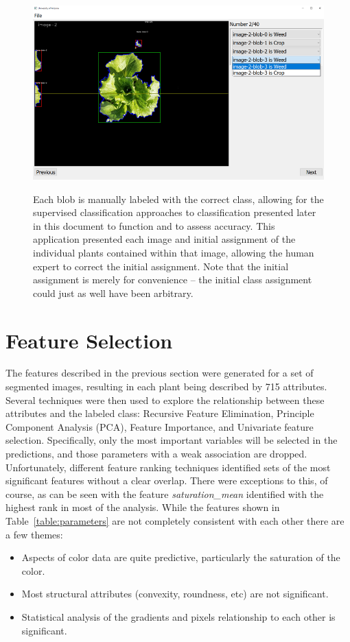 \documentclass[letterpaper]{article}
\begin{document}
{\begin{figure}[h!]
	\centering
	\includegraphics[width=12cm]{./figures/label-screenshot.png}
	\label{fig:label-screenshot}
	\caption[Screenshot of application for manually labeling blobs]{Each blob is manually labeled with the correct class, allowing for the supervised classification approaches to classification presented later in this document to function and to assess accuracy. This application presented each image and initial assignment of the individual plants contained within that image, allowing the human expert to correct the initial assignment. Note that the initial assignment is merely for convenience -- the initial class assignment could just as well have been arbitrary.}
\end{figure}


\section{Feature Selection}
The features described in the previous section were generated for a set of segmented images, resulting in each plant being described by 715 attributes. Several techniques were then used to explore the relationship between these attributes and the labeled class: Recursive Feature Elimination, Principle Component Analysis (PCA), Feature Importance, and Univariate feature selection.  Specifically, only the most important variables will be selected in the predictions, and those parameters with a weak association are dropped. Unfortunately, different feature ranking techniques identified sets of the most significant features without a clear overlap. There were exceptions to this, of course, as can be seen with the feature \textit{saturation\_mean} identified with the highest rank in most of the analysis.
While the features shown in Table~\ref{table:parameters} are not completely consistent with each other there are a few themes:
\begin{itemize}
\item{Aspects of color data are quite predictive, particularly the saturation of the color.}
\item{Most structural attributes (convexity, roundness, etc) are not significant.}
\item{Statistical analysis of the gradients and pixels relationship to each other is significant.}
\end{itemize}

}
\end{document}
